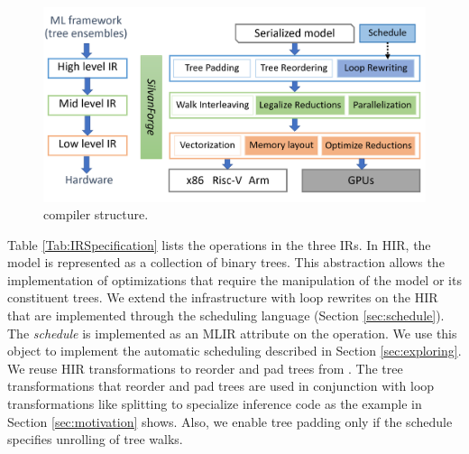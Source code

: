 \begin{figure}[htb]
  \centering
  \includegraphics[width=\linewidth]{figures/compiler.png}
  \caption{\Treebeard{} compiler structure.}
  \label{Fig:CompilerStructure}
\end{figure}

Table \ref{Tab:IRSpecification} lists the operations in the three IRs. 
In HIR, the model is represented as a collection of binary trees. This abstraction
allows the implementation of optimizations that require the manipulation of the model
or its constituent trees. We extend the \TreebeardOLD{} infrastructure with loop rewrites on 
the HIR that are implemented through the scheduling language (Section \ref{sec:schedule}).
The \emph{schedule} is implemented as an MLIR attribute on the  operation.
We use this object to implement the automatic scheduling described in Section \ref{sec:exploring}. 
We reuse HIR transformations to reorder and pad trees from \TreebeardOLD{}.
The tree transformations that reorder and pad trees are used in conjunction 
with loop transformations like splitting to specialize inference code as the example 
in Section \ref{sec:motivation} shows. Also, we enable tree padding only if the schedule 
specifies unrolling of tree walks.

